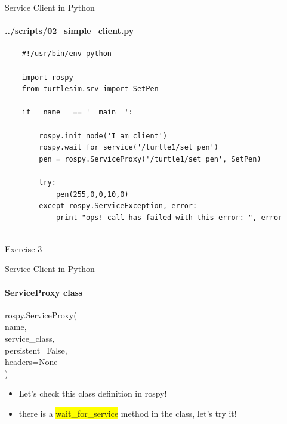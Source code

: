 \documentclass{beamer}
\begin{document}
\begin{frame}[fragile]{Service Client in Python}
    \framesubtitle{   ../scripts/02\_simple\_client.py}
    \begin{lstlisting}
    #!/usr/bin/env python
    
    import rospy
    from turtlesim.srv import SetPen
    
    if __name__ == '__main__':
    
        rospy.init_node('I_am_client')
        rospy.wait_for_service('/turtle1/set_pen')
        pen = rospy.ServiceProxy('/turtle1/set_pen', SetPen)
        
        try:
            pen(255,0,0,10,0)       
        except rospy.ServiceException, error:
            print "ops! call has failed with this error: ", error 
    
    \end{lstlisting}
\end{frame}

\begin{frame}[plain]{}  
    \centering
    {\huge \textcolor{black}{Exercise 3}}
\end{frame}
    
    
    
\begin{frame}[fragile]{Service Client in Python}
    \framesubtitle{ServiceProxy class}
    \begin{focus}
        
        \ttfamily rospy.ServiceProxy(\\
        {\color{red}name},\\
        {\color{red}service\_class},\\
        {\color{blue}persistent=False},\\
        {\color{blue}headers=None}\\
        )
    \end{focus}
\begin{itemize}
        \item Let's check this class definition in rospy!
        \item there is a {\ttfamily \colorbox{yellow}{wait\_for\_service}} method in the class, let's try it!
    \end{itemize}        
\end{frame}
    
\end{document}
